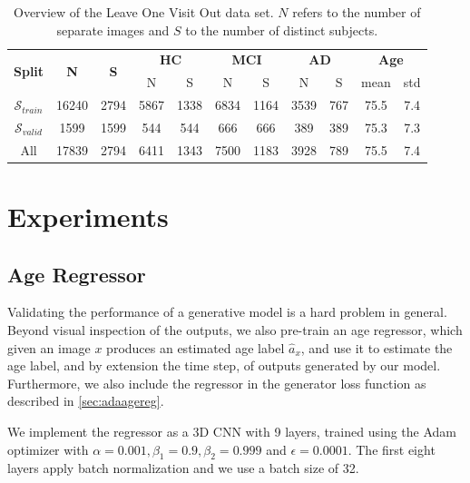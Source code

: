 \begin{table}[h]
	\begin{center}
		\begin{tabular}{c c c c c c c c c c c}
			\toprule
			\multirow{2}{*}{\bfseries Split} & 
			\multirow{2}{*}{\bfseries N} & 
			\multirow{2}{*}{\bfseries S} & 
			\multicolumn{2}{c}{\bfseries HC} & 
			\multicolumn{2}{c}{\bfseries MCI} & 
			\multicolumn{2}{c}{\bfseries AD} &
			\multicolumn{2}{c}{\bfseries Age} \\
			\cmidrule(lr){4-5}
			\cmidrule(lr){6-7}
			\cmidrule(lr){8-9}
			\cmidrule(lr){10-11} 
			& & & N & S & N & S & N & S & mean & std \\ 
			\cmidrule(lr){1-11}
			$\mathcal{S}_{train}$ & 16240 & 2794 & 5867 & 1338 & 6834 & 1164 & 3539 & 767 & 75.5 & 7.4 \\
			$\mathcal{S}_{valid}$ &  1599 & 1599 &  544 &  544 &  666 &  666 &  389 & 389 & 75.3 & 7.3 \\
			\cmidrule(lr){1-11}
			All                   & 17839 & 2794 & 6411 & 1343 & 7500 & 1183 & 3928 & 789 & 75.5 & 7.4 \\
			\bottomrule
		\end{tabular}
		\caption{Overview of the Leave One Visit Out data set. $N$ refers to the number of separate images and $S$ to the number of distinct subjects.}
		\label{tab:looset}
	\end{center}
\end{table}

\chapter{Experiments}

\section{Age Regressor} \label{sec:expagereg}
Validating the performance of a generative model is a hard problem in general. Beyond visual inspection of the outputs, we also pre-train an age regressor, which given an image $x$ produces an estimated age label $\hat a_x$, and use it to estimate the age label, and by extension the time step, of outputs generated by our model. Furthermore, we also include the regressor in the generator loss function as described in \autoref{sec:adaagereg}.

We implement the regressor as a 3D CNN with 9 layers, trained using the Adam optimizer with $\alpha = 0.001, \beta_1 = 0.9, \beta_2 = 0.999 $ and $ \epsilon = 0.0001 $. The first eight layers apply batch normalization and we use a batch size of 32.

